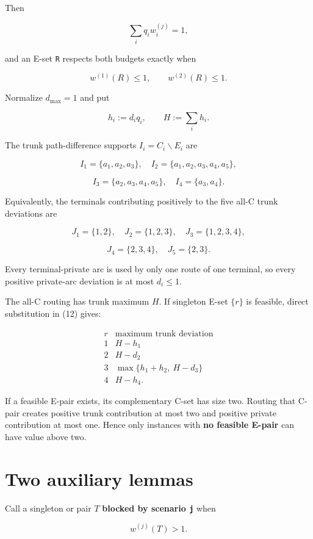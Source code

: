 \documentclass[
  11pt,
]{article}
\begin{document}
Then

\[
\sum_iq_iw_i^{(j)}=1,
\tag{8}
\]

and an E-set \texttt{R} respects both budgets exactly when

\[
w^{(1)}(R)\le1,
\qquad
w^{(2)}(R)\le1.
\tag{9}
\]

Normalize \(d_{\max}=1\) and put

\[
h_i:=d_iq_i,
\qquad
H:=\sum_i h_i.
\tag{10}
\]

The trunk path-difference supports \(I_i=C_i\mathbin{\backslash} E_i\) are

\[
I_1=\{a_1,a_2,a_3\},
\quad
I_2=\{a_1,a_2,a_3,a_4,a_5\},
\]

\[
I_3=\{a_2,a_3,a_4,a_5\},
\quad
I_4=\{a_3,a_4\}.
\tag{11}
\]

Equivalently, the terminals contributing positively to the five all-C
trunk deviations are

\[
J_1=\{1,2\},
\quad
J_2=\{1,2,3\},
\quad
J_3=\{1,2,3,4\},
\]

\[
J_4=\{2,3,4\},
\quad
J_5=\{2,3\}.
\tag{12}
\]

Every terminal-private arc is used by only one route of one terminal, so
every positive private-arc deviation is at most \(d_i\le1\).

The all-C routing has trunk maximum \(H\). If singleton E-set \(\{r\}\)
is feasible, direct substitution in (12) gives:

\[
\begin{array}{c|c}
 r & \text{maximum trunk deviation}\\
\hline
1&H-h_1\\
2&H-d_2\\
3&\max\{h_1+h_2,\ H-d_3\}\\
4&H-h_4.
\end{array}
\tag{13}
\]

If a feasible E-pair exists, its complementary C-set has size two.
Routing that C-pair creates positive trunk contribution at most two and
positive private contribution at most one. Hence only instances with
\textbf{no feasible E-pair} can have value above two.

\section{Two auxiliary lemmas}\label{two-auxiliary-lemmas}

Call a singleton or pair \(T\) \textbf{blocked by scenario \texttt{j}}
when

\[
w^{(j)}(T)>1.
\]
\end{document}
